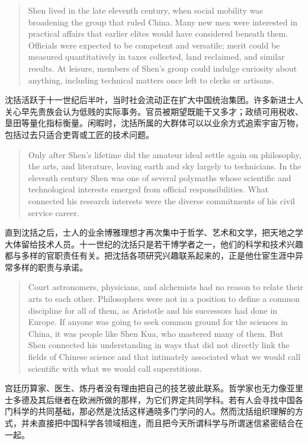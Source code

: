 \documentclass[UTF8,zihao=-4]{ctexart}
\newenvironment{enblock}
  {\par\smallskip\noindent{\scriptsize\bfseries English}\par\begin{quote}\small}
  {\end{quote}}
\newenvironment{zhblock}
  {\par\noindent{\scriptsize\bfseries 中文}\par}
  {\par\medskip}
\begin{document}
\begin{enblock}
Shen lived in the late eleventh century, when social mobility was broadening the group that ruled China. Many new men were interested in practical affairs that earlier elites would have considered beneath them. Officials were expected to be competent and versatile; merit could be measured quantitatively in taxes collected, land reclaimed, and similar results. At leisure, members of Shen's group could indulge curiosity about anything, including technical matters once left to clerks or artisans.
\end{enblock}
\begin{zhblock}
沈括活跃于十一世纪后半叶，当时社会流动正在扩大中国统治集团。许多新进士人关心早先贵族会认为低贱的实际事务。官员被期望既能干又多才；政绩可用税收、垦田等量化指标衡量。闲暇时，沈括所属的大群体可以以业余方式追索宇宙万物，包括过去只适合吏胥或工匠的技术问题。
\end{zhblock}

\begin{enblock}
Only after Shen's lifetime did the amateur ideal settle again on philosophy, the arts, and literature, leaving earth and sky largely to technicians. In the eleventh century Shen was one of several polymaths whose scientific and technological interests emerged from official responsibilities. What connected his research interests were the diverse commitments of his civil service career.
\end{enblock}
\begin{zhblock}
直到沈括之后，士人的业余博雅理想才再次集中于哲学、艺术和文学，把天地之学大体留给技术人员。十一世纪的沈括只是若干博学者之一，他们的科学和技术兴趣都与多样的官职责任有关。把沈括各项研究兴趣联系起来的，正是他仕宦生涯中异常多样的职责与承诺。
\end{zhblock}

\begin{enblock}
Court astronomers, physicians, and alchemists had no reason to relate their arts to each other. Philosophers were not in a position to define a common discipline for all of them, as Aristotle and his successors had done in Europe. If anyone was going to seek common ground for the sciences in China, it was people like Shen Kua, who mastered many of them. But Shen connected his understanding in ways that did not directly link the fields of Chinese science and that intimately associated what we would call scientific with what we would call superstitious.
\end{enblock}
\begin{zhblock}
宫廷历算家、医生、炼丹者没有理由把自己的技艺彼此联系。哲学家也无力像亚里士多德及其后继者在欧洲所做的那样，为它们界定共同学科。若有人会寻找中国各门科学的共同基础，那必然是沈括这样通晓多门学问的人。然而沈括组织理解的方式，并未直接把中国科学各领域相连，而且把今天所谓科学与所谓迷信紧密结合在一起。
\end{zhblock}
\end{document}
